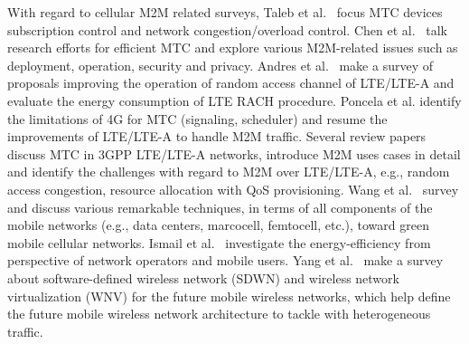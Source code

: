 
With regard to cellular M2M related surveys, Taleb et al.~\cite{journals/cm/TalebK12} focus MTC devices subscription control and network congestion/overload control. Chen et al.~\cite{chen2014machine} talk research efforts for efficient MTC and explore various M2M-related issues such as deployment, operation, security and privacy. Andres et al.~\cite{laya14} make a survey of proposals improving the operation of random access channel of LTE/LTE-A and evaluate the energy consumption of LTE RACH procedure. Poncela et al. \cite{poncela2015m2m} identify the limitations of 4G for MTC (signaling, scheduler) and resume the improvements of LTE/LTE-A to handle M2M traffic. Several review papers~\cite{GhavimiF2015}\cite{mehmood2015mobile} discuss MTC in 3GPP LTE/LTE-A networks, introduce M2M uses cases in detail and identify the challenges with regard to M2M over LTE/LTE-A, e.g., random access congestion, resource allocation with QoS provisioning. Wang et al.~\cite{wang2012survey} survey and discuss various remarkable techniques, in terms of all components of the mobile networks (e.g., data centers, marcocell, femtocell, etc.), toward green mobile cellular networks. Ismail et al.~\cite{ismail2014survey} investigate the energy-efficiency from perspective of network operators and mobile users. Yang et al.~\cite{yang2015software} make a survey about software-defined wireless network (SDWN) and wireless network virtualization (WNV) for the future mobile wireless networks, which help define the future mobile wireless network architecture to tackle with heterogeneous traffic.

